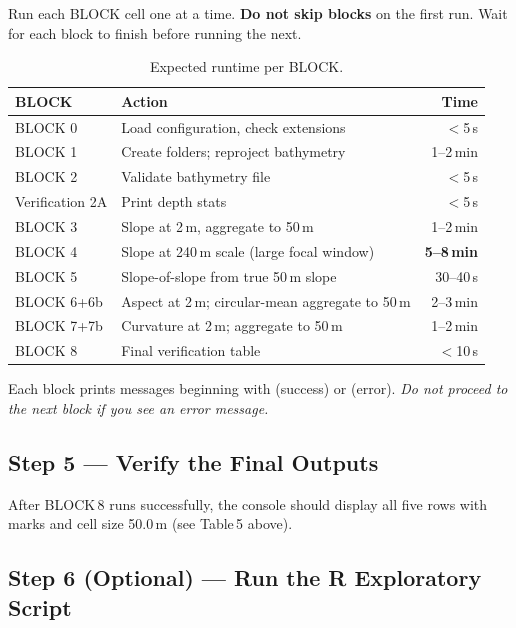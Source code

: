 \documentclass[11pt, a4paper]{article}
\newcommand{\cmark}{\textcolor{OliveGreen}{\ding{51}}}
\newcommand{\xmark}{\textcolor{coralred}{\ding{55}}}
\begin{document}
Run each BLOCK cell one at a time.  \textbf{Do not skip blocks} on the first
run.  Wait for each block to finish before running the next.

\begin{table}[h]
\centering
\caption{Expected runtime per BLOCK.}
\begin{tabular}{llr}
\toprule
\textbf{BLOCK} & \textbf{Action} & \textbf{Time} \\
\midrule
BLOCK 0     & Load configuration, check extensions         & $<$5\,s \\
BLOCK 1     & Create folders; reproject bathymetry         & 1–2\,min \\
BLOCK 2     & Validate bathymetry file                     & $<$5\,s \\
Verification 2A & Print depth stats                         & $<$5\,s \\
BLOCK 3     & Slope at 2\,m, aggregate to 50\,m           & 1–2\,min \\
BLOCK 4     & Slope at 240\,m scale (large focal window)  & \textbf{5–8\,min} \\
BLOCK 5     & Slope-of-slope from true 50\,m slope        & 30–40\,s \\
BLOCK 6+6b  & Aspect at 2\,m; circular-mean aggregate to 50\,m & 2–3\,min \\
BLOCK 7+7b  & Curvature at 2\,m; aggregate to 50\,m       & 1–2\,min \\
BLOCK 8     & Final verification table                    & $<$10\,s \\
\bottomrule
\end{tabular}
\end{table}

Each block prints messages beginning with \textbf{\cmark} (success) or
\textbf{\xmark} (error).  \textit{Do not proceed to the next block if you see
an error message.}

\subsection{Step 5 — Verify the Final Outputs}

After BLOCK\,8 runs successfully, the console should display all five rows with
\cmark{} marks and cell size 50.0\,m (see Table\,5 above).

\subsection{Step 6 (Optional) — Run the R Exploratory Script}
\end{document}
